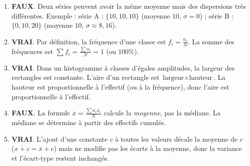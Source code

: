 \documentclass[11pt]{article}
\begin{document}
\begin{corrige}
\begin{enumerate}
\item \textbf{FAUX}. Deux séries peuvent avoir la même moyenne mais des dispersions très différentes. Exemple : série A : $\{10,10,10\}$ (moyenne $10$, $\sigma=0$) ; série B : $\{0,10,20\}$ (moyenne $10$, $\sigma\approx8,16$).
\item \textbf{VRAI}. Par définition, la fréquence d'une classe est $f_i=\frac{n_i}{N}$. La somme des fréquences est $\sum f_i = \frac{\sum n_i}{N}=1$ (ou $100\%$).
\item \textbf{VRAI}. Dans un histogramme à classes d'égales amplitudes, la largeur des rectangles est constante. L'aire d'un rectangle est $ \text{largeur} \times \text{hauteur} $. La hauteur est proportionnelle à l'effectif (ou à la fréquence), donc l'aire est proportionnelle à l'effectif.
\item \textbf{FAUX}. La formule $\overline{x} = \frac{\sum n_i x_i}{N}$ calcule la \emph{moyenne}, pas la médiane. La médiane se détermine à partir des effectifs cumulés.
\item \textbf{VRAI}. L'ajout d'une constante $c$ à toutes les valeurs décale la moyenne de $c$ ($\overline{x+c}=\overline{x}+c$) mais ne modifie pas les écarts à la moyenne, donc la variance et l'écart-type restent inchangés.
\end{enumerate}
\end{corrige}
\end{document}
